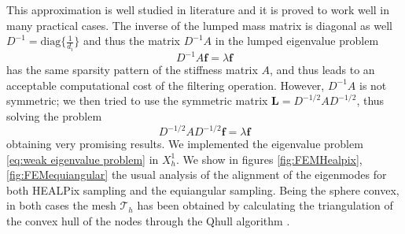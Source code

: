 This approximation is well studied in literature and it is proved to work well in many practical cases. The inverse of the lumped mass matrix is diagonal as well $D^{-1} = \text{diag}\{\frac{1}{d_i}\}$ and thus the matrix $D^{-1}A$ in the lumped eigenvalue problem 
\begin{equation}\label{eq:lumped eigenvalue problem}
	D^{-1}A\mathbf f = \lambda \mathbf f
\end{equation}
has the same sparsity pattern of the stiffness matrix $A$, and thus leads to an acceptable computational cost of the filtering operation. However, $D^{-1}A$ is not symmetric; we then tried to use the symmetric matrix $\mathbf L = D^{-1/2}AD^{-1/2}$, thus solving the problem 
\begin{equation}\label{eq:symmetric lumped eigenvalue problem}
D^{-1/2}AD^{-1/2}\mathbf f = \lambda \mathbf f
\end{equation}
obtaining very promising results.
We implemented the eigenvalue problem \ref{eq:weak eigenvalue problem} in $X_h^1$. We show in figures \ref{fig:FEMHealpix}, \ref{fig:FEMequiangular} the usual analysis of the alignment of the eigenmodes for both HEALPix sampling and the equiangular sampling. Being the sphere convex, in both cases the mesh $\mathcal T_h$ has been obtained by calculating the triangulation of the convex hull of the nodes through the Qhull algorithm \cite{Barber96thequickhull}.

